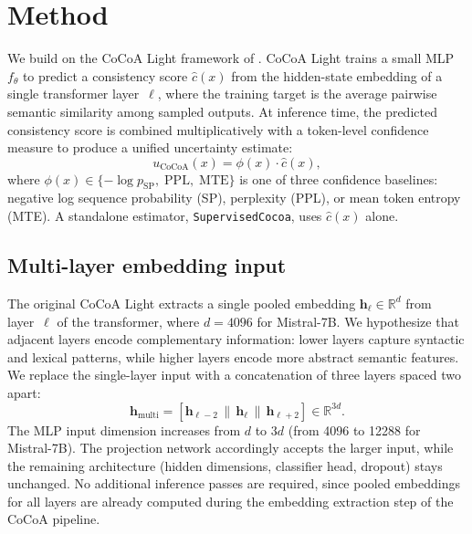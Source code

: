\section{Method}
\label{sec:method}

We build on the CoCoA Light framework of \citet{cocoa2024}.
CoCoA Light trains a small MLP $f_\theta$ to predict a consistency score $\hat{c}(x)$ from the hidden-state embedding of a single transformer layer~$\ell$, where the training target is the average pairwise semantic similarity among sampled outputs.
At inference time, the predicted consistency score is combined multiplicatively with a token-level confidence measure to produce a unified uncertainty estimate:
\begin{equation}
  u_{\mathrm{CoCoA}}(x) = \phi(x) \cdot \hat{c}(x),
  \label{eq:cocoa}
\end{equation}
where $\phi(x) \in \{-\log p_{\mathrm{SP}},\; \mathrm{PPL},\; \mathrm{MTE}\}$ is one of three confidence baselines: negative log sequence probability (SP), perplexity (PPL), or mean token entropy (MTE).
A standalone estimator, \texttt{SupervisedCocoa}, uses $\hat{c}(x)$ alone.

\subsection{Multi-layer embedding input}
\label{sec:multilayer}

The original CoCoA Light extracts a single pooled embedding $\mathbf{h}_\ell \in \mathbb{R}^d$ from layer~$\ell$ of the transformer, where $d = 4096$ for Mistral-7B.
We hypothesize that adjacent layers encode complementary information: lower layers capture syntactic and lexical patterns, while higher layers encode more abstract semantic features.
We replace the single-layer input with a concatenation of three layers spaced two apart:
\begin{equation}
  \mathbf{h}_{\mathrm{multi}} = [\mathbf{h}_{\ell-2} \,\|\, \mathbf{h}_\ell \,\|\, \mathbf{h}_{\ell+2}] \in \mathbb{R}^{3d}.
  \label{eq:multilayer}
\end{equation}
The MLP input dimension increases from $d$ to $3d$ (from 4096 to 12288 for Mistral-7B).
The projection network accordingly accepts the larger input, while the remaining architecture (hidden dimensions, classifier head, dropout) stays unchanged.
No additional inference passes are required, since pooled embeddings for all layers are already computed during the embedding extraction step of the CoCoA pipeline.

